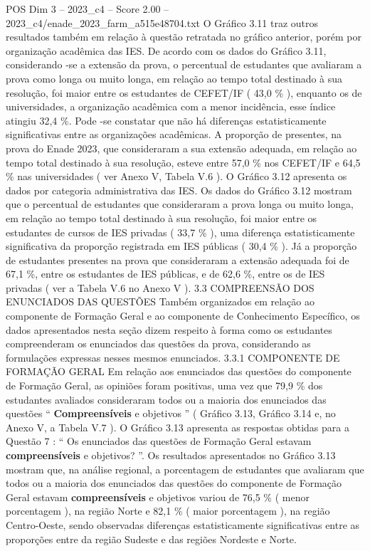 \begin{textsample}{POS Dim 3 – 2023\_c4 – Score 2.00 – 2023\_c4/enade\_2023\_farm\_a515e48704.txt}
O Gráfico 3.11 traz outros resultados também em relação à questão retratada no gráfico anterior, porém por organização acadêmica das IES.
De acordo com os dados do Gráfico 3.11, considerando -se a extensão da prova, o percentual de estudantes que avaliaram a prova como longa ou muito longa, em relação ao tempo total destinado à sua resolução, foi maior entre os estudantes de CEFET/IF ( 43,0 \% ), enquanto os de universidades, a organização acadêmica com a menor incidência, esse índice atingiu 32,4 \%.
Pode -se constatar que não há diferenças estatisticamente significativas entre as organizações acadêmicas.
A proporção de presentes, na prova do Enade 2023, que consideraram a sua extensão adequada, em relação ao tempo total destinado à sua resolução, esteve entre 57,0 \% nos CEFET/IF e 64,5 \% nas universidades ( ver Anexo V, Tabela V.6 ).
O Gráfico 3.12 apresenta os dados por categoria administrativa das IES.
Os dados do Gráfico 3.12 mostram que o percentual de estudantes que consideraram a prova longa ou muito longa, em relação ao tempo total destinado à sua resolução, foi maior entre os estudantes de cursos de IES privadas ( 33,7 \% ), uma diferença estatisticamente significativa da proporção registrada em IES públicas ( 30,4 \% ).
Já a proporção de estudantes presentes na prova que consideraram a extensão adequada foi de 67,1 \%, entre os estudantes de IES públicas, e de 62,6 \%, entre os de IES privadas ( ver a Tabela V.6 no Anexo V ). 3.3 COMPREENSÃO DOS ENUNCIADOS DAS QUESTÕES Também organizados em relação ao componente de Formação Geral e ao componente de Conhecimento Específico, os dados apresentados nesta seção dizem respeito à forma como os estudantes compreenderam os enunciados das questões da prova, considerando as formulações expressas nesses mesmos enunciados. 3.3.1 COMPONENTE DE FORMAÇÃO GERAL Em relação aos enunciados das questões do componente de Formação Geral, as opiniões foram positivas, uma vez que 79,9 \% dos estudantes avaliados consideraram todos ou a maioria dos enunciados das questões “ \textbf{Compreensíveis} e objetivos ” ( Gráfico 3.13, Gráfico 3.14 e, no Anexo V, a Tabela V.7 ).
O Gráfico 3.13 apresenta as respostas obtidas para a Questão 7 : “ Os enunciados das questões de Formação Geral estavam \textbf{compreensíveis} e objetivos? ”.
Os resultados apresentados no Gráfico 3.13 mostram que, na análise regional, a porcentagem de estudantes que avaliaram que todos ou a maioria dos enunciados das questões do componente de Formação Geral estavam \textbf{compreensíveis} e objetivos variou de 76,5 \% ( menor porcentagem ), na região Norte e 82,1 \% ( maior porcentagem ), na região Centro-Oeste, sendo observadas diferenças estatisticamente significativas entre as proporções entre da região Sudeste e das regiões Nordeste e Norte.

\end{textsample}
